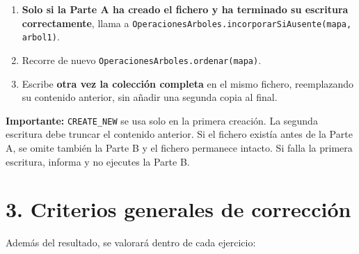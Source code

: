\documentclass[a4paper,12pt]{article}
\begin{document}
\begin{enumerate}[start=5]
\item \textbf{Solo si la Parte A ha creado el fichero y ha terminado su escritura correctamente}, llama a \texttt{O\allowbreak{}p\allowbreak{}e\allowbreak{}r\allowbreak{}a\allowbreak{}c\allowbreak{}i\allowbreak{}o\allowbreak{}n\allowbreak{}e\allowbreak{}s\allowbreak{}A\allowbreak{}r\allowbreak{}b\allowbreak{}o\allowbreak{}l\allowbreak{}e\allowbreak{}s\allowbreak{}.\allowbreak{}i\allowbreak{}n\allowbreak{}c\allowbreak{}o\allowbreak{}r\allowbreak{}p\allowbreak{}o\allowbreak{}r\allowbreak{}a\allowbreak{}r\allowbreak{}S\allowbreak{}i\allowbreak{}A\allowbreak{}u\allowbreak{}s\allowbreak{}e\allowbreak{}n\allowbreak{}t\allowbreak{}e\allowbreak{}(\allowbreak{}m\allowbreak{}a\allowbreak{}p\allowbreak{}a\allowbreak{},\allowbreak{} \allowbreak{}a\allowbreak{}r\allowbreak{}b\allowbreak{}o\allowbreak{}l\allowbreak{}1\allowbreak{})}.
\item Recorre de nuevo \texttt{O\allowbreak{}p\allowbreak{}e\allowbreak{}r\allowbreak{}a\allowbreak{}c\allowbreak{}i\allowbreak{}o\allowbreak{}n\allowbreak{}e\allowbreak{}s\allowbreak{}A\allowbreak{}r\allowbreak{}b\allowbreak{}o\allowbreak{}l\allowbreak{}e\allowbreak{}s\allowbreak{}.\allowbreak{}o\allowbreak{}r\allowbreak{}d\allowbreak{}e\allowbreak{}n\allowbreak{}a\allowbreak{}r\allowbreak{}(\allowbreak{}m\allowbreak{}a\allowbreak{}p\allowbreak{}a\allowbreak{})}.
\item Escribe \textbf{otra vez la colección completa} en el mismo fichero, reemplazando su contenido anterior, sin añadir una segunda copia al final.
\end{enumerate}

\textbf{Importante:} \texttt{CREATE\_NEW} se usa solo en la primera creación. La segunda escritura debe truncar el contenido anterior. Si el fichero existía antes de la Parte A, se omite también la Parte B y el fichero permanece intacto. Si falla la primera escritura, informa y no ejecutes la Parte B.\par

\section*{\color{primary}3. Criterios generales de corrección}

Además del resultado, se valorará dentro de cada ejercicio:\par
\end{document}
